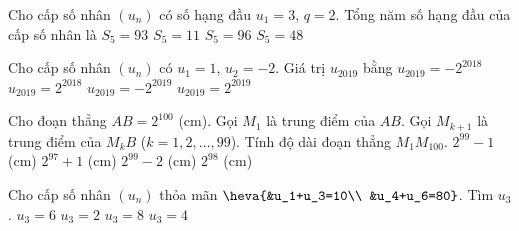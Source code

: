 \begin{ex}%
	Cho cấp số nhân $(u_n)$ có số hạng đầu $u_1=3$, $q=2$. Tổng năm số hạng đầu của cấp số nhân là
	\choice
	{\True $S_5=93$}
	{$S_5=11$}
	{$S_5=96$}
	{$S_5=48$}
\end{ex}%
\begin{ex}%
Cho cấp số nhân $\left( u_n\right)$ có $u_1=1$, $u_2=-2$. Giá trị $u_{2019}$ bằng	
	\choice
	{$u_{2019}=-2^{2018}$}
	{\True $u_{2019}=2^{2018}$}
	{$u_{2019}=-2^{2019}$}
	{$u_{2019}=2^{2019}$}
\end{ex}%
\begin{ex}%
	Cho đoạn thẳng $AB=2^{100}$ (cm). Gọi $M_1$ là trung điểm của $AB$. Gọi $M_{k+1}$ là trung điểm của $M_kB$ ($k=1,2,\ldots ,99$). Tính độ dài đoạn thẳng $M_1M_{100}$.
	\choice
	{\True $2^{99}-1$ (cm)}
	{$2^{97}+1$ (cm)}
	{$2^{99}-2$ (cm)}
	{$2^{98}$ (cm)}
\end{ex}%
\begin{ex}%
Cho cấp số nhân $(u_n)$ thỏa mãn $\heva{&u_1+u_3=10\\ &u_4+u_6=80}$. Tìm $u_3$.
\choice
{$u_3=6$}
{$u_3=2$}
{\True $u_3=8$}
{$u_3=4$}
\end{ex}